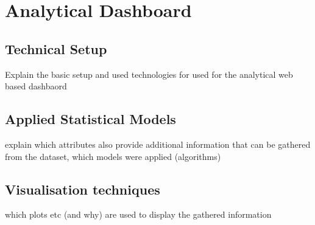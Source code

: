 %
%
% 
% 
% 

\chapter{Analytical Dashboard}
\label{chap:analytical_dashboard}


\section{Technical Setup}
Explain the basic setup and used technologies for used for the analytical web based dashbaord 


\section{Applied Statistical Models}
explain which attributes also provide additional information that can be gathered from the dataset, which models were applied (algorithms) 

\section{Visualisation techniques}
which plots etc (and why) are used to display the gathered information 

